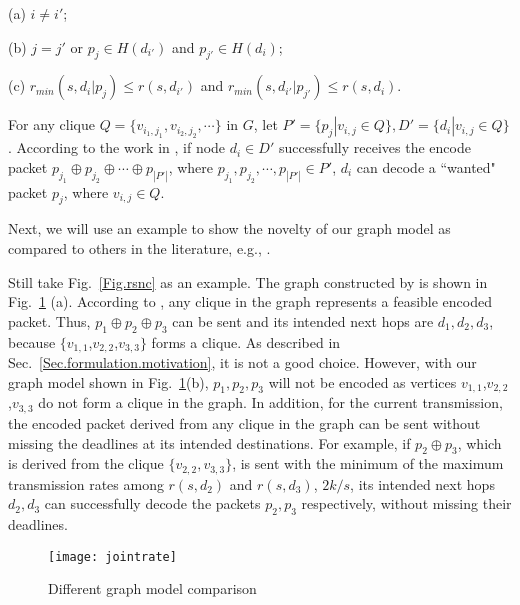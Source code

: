 \documentclass[journal]{IEEEtran}
\begin{document}
(a) $i\neq i'$;

(b) $j=j'$ or $p_j\in H(d_{i'})$ and $p_{j'}\in H(d_i)$;

(c) $r_{min}(s,d_i|p_j)\leq r(s,d_{i'})$ and $r_{min}(s,d_{i'}|p_{j'})\leq r(s,d_i)$.

For any clique $Q=\{v_{i_1,j_1},v_{i_2,j_2},\cdots\}$ in $G$, let $P'=\{p_j|v_{i,j}\in Q\},D'=\{d_i|v_{i,j}\in Q\}$. According to the work in \cite{ZX2010Broadcast6}, if node $d_i\in D'$ successfully receives the encode packet $p_{j_1}\oplus p_{j_2}\oplus \cdots\oplus p_{|P'|}$, where $p_{j_1}, p_{j_2},\cdots,p_{|P'|} \in P'$, $d_i$ can decode a ``wanted" packet $p_j$, where $v_{i,j}\in Q$.

Next, we will use an example to show the novelty of our graph model as compared to others in the literature, e.g., \cite{ZX2010Broadcast6}.

Still take Fig.~\ref{Fig.rsnc} as an example. The graph constructed by \cite{ZX2010Broadcast6} is shown in Fig.~\ref{Fig.example} (a). According to \cite{ZX2010Broadcast6}, any clique in the graph represents a feasible encoded packet. Thus, $p_1\oplus p_2\oplus p_3$ can be sent and its intended next hops are $d_1,d_2,d_3$, because $\{v_{1,1}$,$v_{2,2}$,$v_{3,3}\}$ forms a clique. As described in Sec.~\ref{Sec.formulation.motivation}, it is not a good choice.
However, with our graph model shown in Fig.~\ref{Fig.example}(b), $p_1,p_2, p_3$ will not be encoded as vertices
$v_{1,1}$,$v_{2,2}$,$v_{3,3}$ do not form a clique in the graph. In addition, for the current transmission, the encoded packet derived from any clique in the graph can be sent without missing the deadlines at its intended destinations. For example, if $p_2\oplus p_3$, which is derived from the clique $\{v_{2,2},v_{3,3}\}$, is sent with the minimum of the maximum transmission rates among $r(s,d_2)$ and $r(s,d_3)$, $2k/s$, its intended next hops $d_2,d_3$ can successfully decode the packets $p_2,p_3$ respectively, without missing their deadlines.

\begin{figure}[t]
\begin{center}
\texttt{[image: jointrate]}\vspace{-0.08in}
\caption{Different graph model comparison}\vspace{-0.15in}\label{Fig.example}
\end{center}\vspace{-0.1in}
\end{figure}
\end{document}

